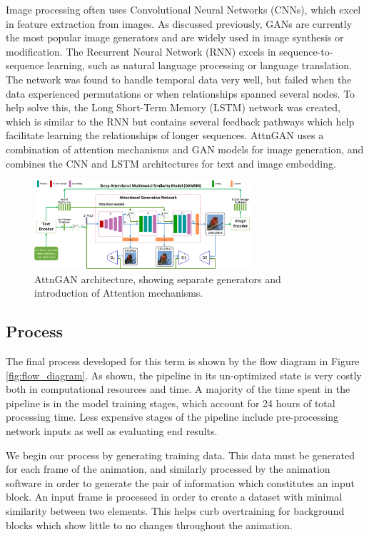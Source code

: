 \documentclass[letterpaper]{article} %
\begin{document}
Image processing often uses Convolutional Neural Networks (CNNs), which excel 
in feature extraction from images. As discussed previously, GANs are currently 
the most popular image generators and are widely used in image synthesis or 
modification. The Recurrent Neural Network (RNN) 
excels in sequence-to-sequence learning, such as natural language processing or 
language translation. The network was found to handle temporal data very well, 
but failed when the data experienced permutations or when relationships spanned 
several nodes. To help solve this, the Long Short-Term Memory (LSTM) network 
was created, which is similar to the RNN but contains several feedback pathways 
which help facilitate learning the relationships of longer sequences.
AttnGAN uses a combination of attention mechanisms and GAN models for image 
generation, and combines the CNN and LSTM architectures for text and image 
embedding.

\begin{figure}[htbp]
\centerline{\includegraphics[width=8cm]{attngan.png}}
\caption{AttnGAN architecture, showing separate generators and introduction 
of Attention mechanisms.}
\label{fig:attngan}
\end{figure}

\subsection{Process}
The final process developed for this term is shown by the flow diagram in 
Figure \ref{fig:flow_diagram}. As shown, the pipeline in its un-optimized state 
is very costly both in computational resources and time. A majority of the time 
spent in the pipeline is in the model training stages, which account for 24 
hours of total processing time. Less expensive stages of the pipeline include 
pre-processing network inputs as well as evaluating end results.

We begin our process by generating training data.
This data must be generated for each frame of the animation, and similarly 
processed by the animation software in order to generate the pair of 
information which constitutes an input block. An input frame is processed in 
order to create a dataset with minimal similarity between two elements. This 
helps curb overtraining for background blocks which show little 
to no changes throughout the animation.
\end{document}
